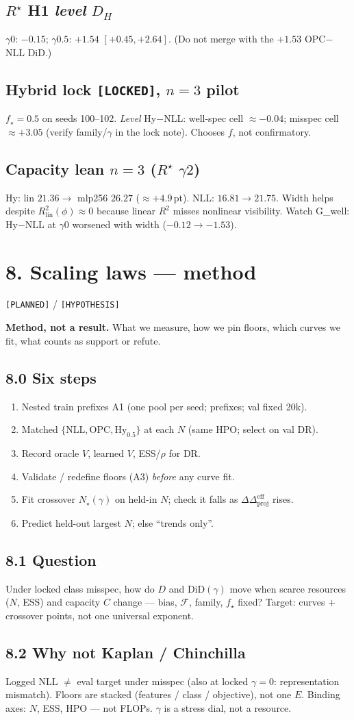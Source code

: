 \documentclass[11pt]{article}
\newcommand{\phonesection}[1]{\Needspace{8\baselineskip}\section*{#1}}
\newcommand{\phonesub}[1]{\Needspace{6\baselineskip}\subsection*{#1}}
\newcommand{\stag}[1]{\texttt{[#1]}}
\newcommand{\Rstar}{R^{\star}}
\newcommand{\DDprojeff}{\Delta\Delta_{\mathrm{proj}}^{\mathrm{eff}}}
\begin{document}
\phonesub{$\Rstar$ H1 \emph{level} $D_{H}$}
$\gamma0$: $-0.15$;
$\gamma0.5$: $+1.54$ $[+0.45,+2.64]$.
(Do not merge with the $+1.53$ OPC$-$NLL DiD.)

\phonesub{Hybrid lock \stag{LOCKED}, $n{=}3$ pilot}
$f_{\star}{=}0.5$ on seeds 100--102.
\emph{Level} Hy$-$NLL: well-spec cell
$\approx -0.04$; misspec cell
$\approx +3.05$ (verify family/$\gamma$ in
the lock note).  Chooses $f$, not
confirmatory.

\phonesub{Capacity lean $n{=}3$ ($\Rstar$ $\gamma2$)}
Hy: lin $21.36\to$ mlp256 $26.27$
($\approx +4.9$\,pt).  NLL: $16.81\to 21.75$.
Width helps despite
$R^{2}_{\mathrm{lin}}(\phi)\approx 0$ because
linear $R^{2}$ misses nonlinear visibility.
Watch G\_well: Hy$-$NLL at $\gamma0$ worsened
with width ($-0.12\to -1.53$).

\phonesection{8. Scaling laws --- method}

\stag{PLANNED} / \stag{HYPOTHESIS}

\textbf{Method, not a result.}  What we
measure, how we pin floors, which curves we
fit, what counts as support or refute.

\phonesub{8.0 Six steps}
\begin{enumerate}
  \item Nested train prefixes A1 (one pool
        per seed; prefixes; val fixed 20k).
  \item Matched $\{\mathrm{NLL},\mathrm{OPC},
        \mathrm{Hy}_{0.5}\}$ at each $N$
        (same HPO; select on val DR).
  \item Record oracle $V$, learned $V$,
        ESS/$\rho$ for DR.
  \item Validate / redefine floors (A3)
        \emph{before} any curve fit.
  \item Fit crossover $N_{\star}(\gamma)$ on
        held-in $N$; check it falls as
        $\DDprojeff$ rises.
  \item Predict held-out largest $N$; else
        ``trends only''.
\end{enumerate}

\phonesub{8.1 Question}
Under locked class misspec, how do
$D$ and $\mathrm{DiD}(\gamma)$ move when
scarce resources ($N$, ESS) and capacity $C$
change --- bias, $\mathcal{F}$, family,
$f_{\star}$ fixed?  Target: curves $+$
crossover points, not one universal
exponent.

\phonesub{8.2 Why not Kaplan / Chinchilla}
Logged NLL $\ne$ eval target under misspec
(also at locked $\gamma{=}0$: representation
mismatch).  Floors are stacked (features /
class / objective), not one $E$.  Binding
axes: $N$, ESS, HPO --- not FLOPs.  $\gamma$
is a stress dial, not a resource.
\end{document}
